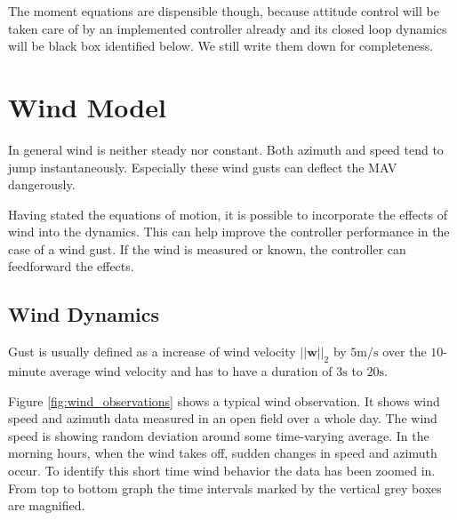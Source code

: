 The moment equations are dispensible though, because attitude control will be taken care of by an implemented controller already and its closed loop dynamics will be black box identified below. We still write them down for completeness.

\section{Wind Model}
\label{sec:wind_model}
In general wind is neither steady nor constant. Both azimuth and speed tend to jump instantaneously. Especially these wind gusts can deflect the MAV dangerously.

Having stated the equations of motion, it is possible to incorporate the effects of wind into the dynamics. This can help improve the controller performance in the case of a wind gust. If the wind is measured or known, the controller can feedforward the effects.

\subsection{Wind Dynamics}
Gust is usually defined as a increase of wind velocity $||\mathbf{w}||_2$ by $5\si{\metre\per\second}$ over the $10$-minute average wind velocity and has to have a duration of $3 \si{\second}$ to $20 \si{\second}$.

Figure \ref{fig:wind_observations} shows a typical wind observation. It shows wind speed and azimuth data measured in an open field over a whole day. The wind speed is showing random deviation around some time-varying average. In the morning hours, when the wind takes off, sudden changes in speed and azimuth occur. To identify this short time wind behavior the data has been zoomed in. From top to bottom graph the time intervals marked by the vertical grey boxes are magnified.

